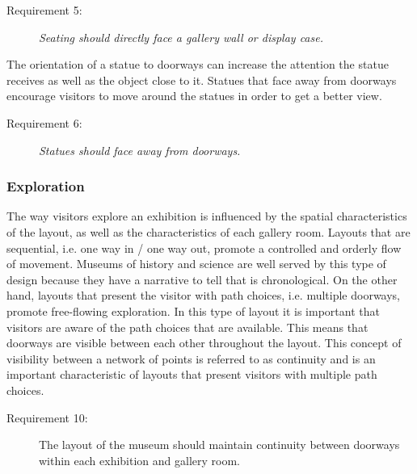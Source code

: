 \documentclass[12pt]{ucthesis}
\begin{document}
\begin{description}
\item[Requirement 5:] \emph{Seating should directly face a gallery wall or display case.}
\end{description}

The orientation of a statue to doorways can increase the attention the statue receives as well as the object close to it. Statues that face away from doorways encourage visitors to move around the statues in order to get a better view.  
\begin{description}
\item[Requirement 6:] \emph{Statues should face away from doorways.}
\end{description}


\subsubsection{Exploration}
The way visitors explore an exhibition is influenced by the spatial characteristics of the layout, as well as the characteristics of each gallery room. Layouts that are sequential, i.e. one way in / one way out, promote a controlled and orderly flow of movement. Museums of history and science are well served by this type of design because they have a narrative to tell that is chronological. On the other hand, layouts that present the visitor with path choices, i.e. multiple doorways, promote free-flowing exploration. In this type of layout it is important that visitors are aware of the path choices that are available. This means that doorways are visible between each other throughout the layout. This concept of visibility between a network of points is referred to as continuity and is an important characteristic of layouts that present visitors with multiple path choices.  

\begin{description}
\item[Requirement 10:] The layout of the museum should maintain continuity between doorways within each exhibition and gallery room.
\end{description}

\end{document}
